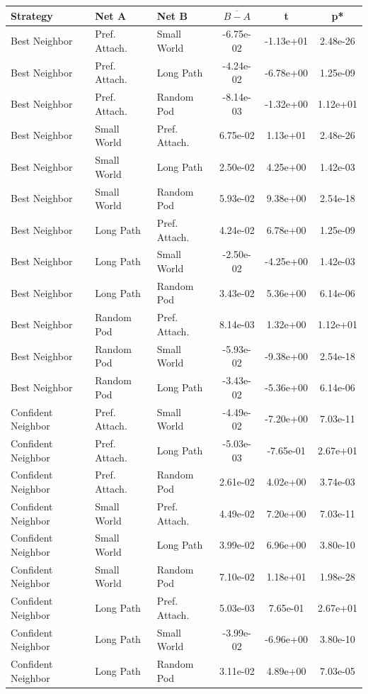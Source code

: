 \begin{table}[]
    \label{tab:t-instrat-parallel}
    \centering
    \begin{tabular}{l|ll|ccc}
        Strategy & Net A & Net B & $\overline{B - A}$ & t & p* \\
    \hline
Best Neighbor&Pref. Attach.&Small World&-6.75e-02&-1.13e+01&2.48e-26\\
Best Neighbor&Pref. Attach.&Long Path&-4.24e-02&-6.78e+00&1.25e-09\\
Best Neighbor&Pref. Attach.&Random Pod&-8.14e-03&-1.32e+00&1.12e+01\\
Best Neighbor&Small World&Pref. Attach.&6.75e-02&1.13e+01&2.48e-26\\
Best Neighbor&Small World&Long Path&2.50e-02&4.25e+00&1.42e-03\\
Best Neighbor&Small World&Random Pod&5.93e-02&9.38e+00&2.54e-18\\
Best Neighbor&Long Path&Pref. Attach.&4.24e-02&6.78e+00&1.25e-09\\
Best Neighbor&Long Path&Small World&-2.50e-02&-4.25e+00&1.42e-03\\
Best Neighbor&Long Path&Random Pod&3.43e-02&5.36e+00&6.14e-06\\
Best Neighbor&Random Pod&Pref. Attach.&8.14e-03&1.32e+00&1.12e+01\\
Best Neighbor&Random Pod&Small World&-5.93e-02&-9.38e+00&2.54e-18\\
Best Neighbor&Random Pod&Long Path&-3.43e-02&-5.36e+00&6.14e-06\\
\hline
Confident Neighbor&Pref. Attach.&Small World&-4.49e-02&-7.20e+00&7.03e-11\\
Confident Neighbor&Pref. Attach.&Long Path&-5.03e-03&-7.65e-01&2.67e+01\\
Confident Neighbor&Pref. Attach.&Random Pod&2.61e-02&4.02e+00&3.74e-03\\
Confident Neighbor&Small World&Pref. Attach.&4.49e-02&7.20e+00&7.03e-11\\
Confident Neighbor&Small World&Long Path&3.99e-02&6.96e+00&3.80e-10\\
Confident Neighbor&Small World&Random Pod&7.10e-02&1.18e+01&1.98e-28\\
Confident Neighbor&Long Path&Pref. Attach.&5.03e-03&7.65e-01&2.67e+01\\
Confident Neighbor&Long Path&Small World&-3.99e-02&-6.96e+00&3.80e-10\\
Confident Neighbor&Long Path&Random Pod&3.11e-02&4.89e+00&7.03e-05\\

\end{tabular}
\end{table}
